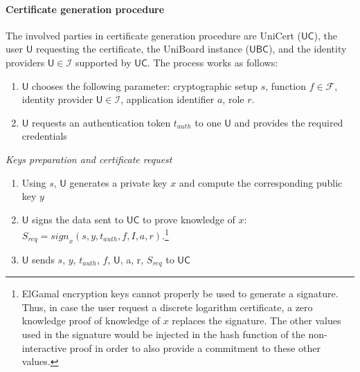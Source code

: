 \documentclass[bibtotoc,halfparskip,oneside]{scrreprt}
\newcommand{\User}{\ensuremath{\mathsf{U}}\xspace}
\newcommand{\IdentityProvider}{\ensuremath{\mathsf{U}}\xspace}
\newcommand{\UBC}{\ensuremath{\mathsf{UBC}}\xspace}
\newcommand{\UC}{\ensuremath{\mathsf{UC}}\xspace}
\begin{document}
\paragraph*{Certificate generation procedure} The involved parties in certificate generation procedure are UniCert (\UC), the user $\User$ requesting the certificate, the UniBoard instance (\UBC), and the identity providers $\IdentityProvider\in\mathcal{I}$ supported by \UC. The process works as follows:

\begin{enumerate}
	\item $\User$ chooses the following parameter: cryptographic setup $s$, function $\mathit{f} \in \mathcal{F}$, identity provider $\IdentityProvider \in \mathcal{I}$, application identifier $a$, role $r$.
	\item $\User$ requests an authentication token $t_{auth}$ to one $\IdentityProvider$ and provides the required credentials
\end{enumerate} 

\textit{Keys preparation and certificate request}
\begin{enumerate}[resume]
	\item Using $s$, $\User$ generates a private key $x$ and compute the corresponding public key $y$
	\item $\User$ signs the data sent to \UC to prove knowledge of $x$: $S_{req} = \mathit{sign}_{x}(s, y, t_{auth},\mathit{f}, I, a, r)$.\footnote{ElGamal encryption keys cannot properly be used to generate a signature. Thus, in case the user request a discrete logarithm certificate, a zero knowledge proof of knowledge of $x$ replaces the signature. The other values used in the signature would be injected in the hash function of the non-interactive proof in order to also provide a commitment to these other values.}
	\item $\User$ sends $s$, $y$, $t_{auth}$, $\mathit{f}$, $\IdentityProvider$, a, r, $S_{req}$ to \UC
\end{enumerate} 

\end{document}
